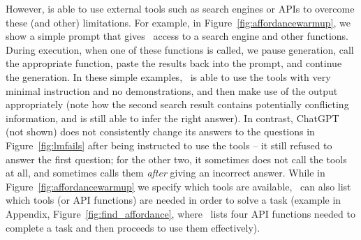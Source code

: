 However,  \DV is able to use external tools such as search engines or APIs to overcome these (and other) limitations. For example, in Figure~\ref{fig:affordancewarmup}, we show a simple prompt that gives \DV\ access to a search engine and other functions. During execution, when one of these functions is called, we pause generation, call the appropriate function, paste the results back into the prompt, and continue the generation.
In these simple examples, \DV\ is able to use the tools with very minimal instruction and no demonstrations, and then make use of the output appropriately (note how the second search result contains potentially conflicting information, and \DV is still able to infer the right answer).
In contrast, ChatGPT (not shown) does not consistently change its answers to the questions in Figure~\ref{fig:lmfails} after being instructed to use the tools --  it still refused to answer the first question; for the other two, it sometimes does not call the tools at all, and sometimes calls them \emph{after} giving an incorrect answer.
While in Figure~\ref{fig:affordancewarmup} we specify which tools are available, \DV\ can also list which tools (or API functions) are needed in order to solve a task (example in Appendix, Figure~\ref{fig:find_affordance}, where \DV\ lists four API functions needed to complete a task and then proceeds to use them effectively).


% 
% 
% 
% 
% 
% 


